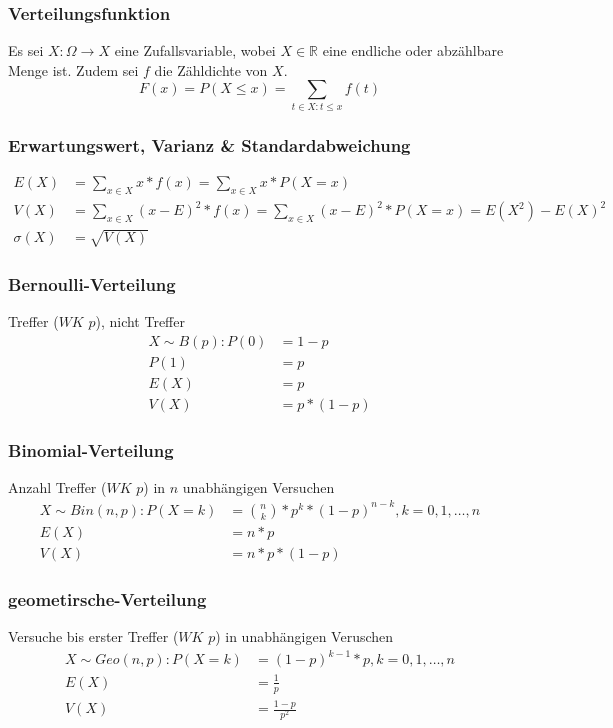 \documentclass[landscape,twocolumn,a4paper]{article}
\newcommand{\RN}{\mathbb{R}} %
\begin{document}
\subsubsection*{Verteilungsfunktion}
Es sei $X : \Omega \rightarrow X$ eine Zufallsvariable, wobei $X \in \RN$ eine endliche oder abzählbare Menge ist. Zudem sei $f$ die Zähldichte von $X$.
\begin{equation}
	F(x)=P(X \leq x) = \sum_{t \in X:t \leq x} f(t)
\end{equation}

\subsubsection*{Erwartungswert, Varianz \& Standardabweichung}
\begin{align}
	E(X) &=\sum_{x \in X} x * f(x)=\sum_{x \in X} x * P(X = x) \\
	V(X)&= \sum_{x \in X} (x - E)^2 * f(x) = \sum_{x \in X} (x - E)^2 * P(X=x) = E(X^2)-E(X)^2 \\
	\sigma(X) &= \sqrt{V(X)}
\end{align}

\subsubsection*{Bernoulli-Verteilung}
Treffer ($WK$ $p$), nicht Treffer
\begin{align}
	X \sim B(p): P(0) &= 1 - p \\
	P(1) &= p \\
	E(X) &= p \\
	V(X) &= p*(1-p)
\end{align} 

\subsubsection*{Binomial-Verteilung}
Anzahl Treffer ($WK$ $p$) in $n$ unabhängigen Versuchen
\begin{align}
	X \sim Bin(n,p): P(X=k) &= \binom{n}{k} * p^k * (1-p)^{n-k}, k=0,1, \dots, n \\
	E(X) &= n*p \\
	V(X) &= n*p*(1-p)
\end{align} 

\subsubsection*{geometirsche-Verteilung}
Versuche bis erster Treffer ($WK$ $p$) in unabhängigen Veruschen
\begin{align}
	X \sim Geo(n,p): P(X=k) &= (1-p)^{k-1}*p, k=0,1, \dots, n \\
	E(X) &= \frac{1}{p}\\
	V(X) &= \frac{1-p}{p^2}
\end{align} 
\end{document}
